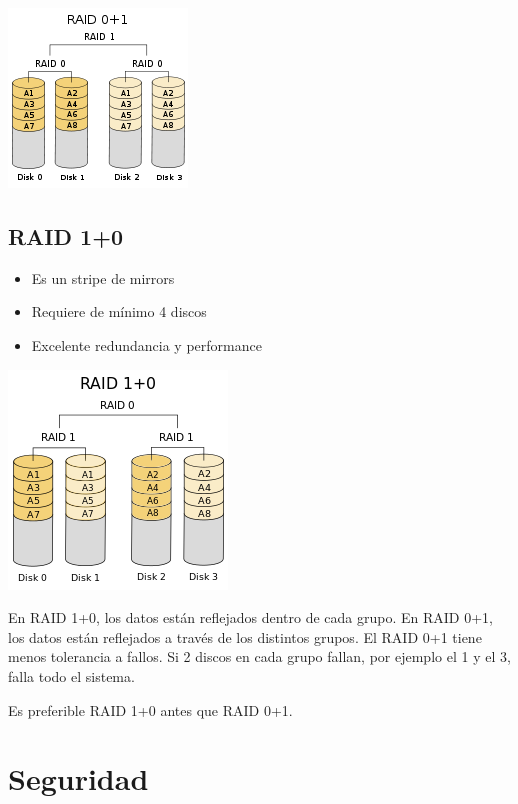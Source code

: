 \includegraphics[scale=1.3]{imagenes/raid0+1}

\subsection{RAID 1+0}

\begin{itemize}
\item Es un stripe de mirrors
\item Requiere de mínimo 4 discos
\item Excelente redundancia y performance
\end{itemize}

\includegraphics[scale=1.3]{imagenes/raid1+0}

En RAID 1+0, los datos están reflejados dentro de cada grupo. En RAID 0+1, los datos están reflejados a través de los distintos grupos. El RAID 0+1 tiene menos tolerancia a fallos. Si 2 discos en cada grupo fallan, por ejemplo el 1 y el 3, falla todo el sistema.

Es preferible RAID 1+0 antes que RAID 0+1.

\newpage

\section{Seguridad}


